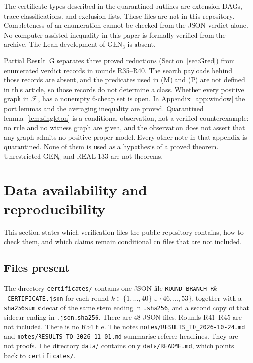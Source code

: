 \documentclass[11pt]{amsart}
\theoremstyle{definition}
\theoremstyle{remark}
\newcommand{\GEN}{\mathrm{GEN}}
\begin{document}
The certificate types described in the quarantined outlines are extension DAGs, trace classifications, and exclusion lists. Those files are not in this repository. Completeness of an enumeration cannot be checked from the JSON verdict alone. No computer-assisted inequality in this paper is formally verified from the archive. The Lean development of $\GEN_3$ is absent.

Partial Result~G separates three proved reductions (Section~\ref{sec:Gred}) from enumerated verdict records in rounds R35--R40. The search payloads behind those records are absent, and the predicates used in (M) and (P) are not defined in this article, so those records do not determine a class. Whether every positive graph in $\mathcal F_0$ has a nonempty $6$-cheap set is open. In Appendix~\ref{app:window} the port lemmas and the averaging inequality are proved. Quarantined lemma~\ref{lem:singleton} is a conditional observation, not a verified counterexample: no rule and no witness graph are given, and the observation does not assert that any graph admits no positive proper model. Every other note in that appendix is quarantined. None of them is used as a hypothesis of a proved theorem. Unrestricted $\GEN_6$ and REAL-133 are not theorems.


\section{Data availability and reproducibility}\label{sec:data}

This section states which verification files the public repository contains, how to check them, and which claims remain conditional on files that are not included.

\subsection*{Files present}
The directory \nolinkurl{certificates/} contains one JSON file \texttt{ROUND\_BRANCH\_R$k$\_CERTIFICATE.json} for each round $k\in\{1,\ldots,40\}\cup\{46,\ldots,53\}$, together with a \texttt{sha256sum} sidecar of the same stem ending in \texttt{.sha256}, and a second copy of that sidecar ending in \texttt{.json.sha256}. There are $48$ JSON files. Rounds R41--R45 are not included. There is no R54 file. The notes \nolinkurl{notes/RESULTS_TO_2026-10-24.md} and \nolinkurl{notes/RESULTS_TO_2026-11-01.md} summarise referee headlines. They are not proofs. The directory \nolinkurl{data/} contains only \nolinkurl{data/README.md}, which points back to \nolinkurl{certificates/}.
\end{document}
